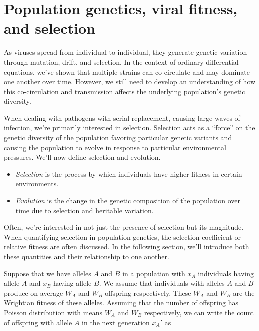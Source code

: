 
\section{Population genetics, viral fitness, and selection}

As viruses spread from individual to individual, they generate genetic variation through mutation, drift, and selection.
In the context of ordinary differential equations, we've shown that multiple strains can co-circulate and may dominate one another over time.
However, we still need to develop an understanding of how this co-circulation and transmission affects the underlying population's genetic diversity.

When dealing with pathogens with serial replacement, causing large waves of infection, we're primarily interested in selection.
Selection acts as a ``force'' on the genetic diversity of the population favoring particular genetic variants and causing the population to evolve in response to particular environmental pressures.
We'll now define selection and evolution.

\begin{itemize}
  \item \emph{Selection} is the process by which individuals have higher fitness  in certain environments.
  \item \emph{Evolution} is the change in the genetic composition of the population over time due to selection and heritable variation. 
\end{itemize}

Often, we’re interested in not just the presence of selection but its magnitude.
When quantifying selection in population genetics, the selection coefficient or relative fitness are often discussed.
In the following section, we'll introduce both these quantities and their relationship to one another.

Suppose that we have alleles $A$ and $B$ in a population with $x_A$ individuals having allele $A$ and $x_B$ having allele $B$.
We assume that individuals with alleles $A$ and $B$ produce on average $W_A$ and $W_B$ offspring respectively.
These $W_A$ and $W_B$ are the Wrightian fitness of these alleles.
Assuming that the number of offspring has Poisson distribution with means $W_A$ and $W_B$ respectively, we can write the count of offspring with allele $A$ in the next generation $x_A'$ as

